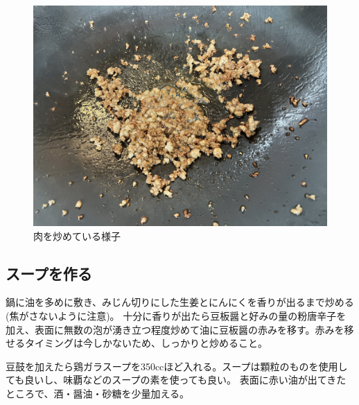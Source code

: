 \documentclass[a4paper,10pt,xelatex,ja=standard,twocolumn]{bxjsarticle}
\begin{document}
\begin{figure}[h]
  \caption{肉を炒めている様子}
  \label{niku}
  \begin{center}
    \includegraphics[width=\linewidth]{IMG_4081.jpg}
  \end{center}
\end{figure}

\subsection{スープを作る}

鍋に油を多めに敷き、みじん切りにした生姜とにんにくを香りが出るまで炒める(焦がさないように注意)。
十分に香りが出たら豆板醤と好みの量の粉唐辛子を加え、表面に無数の泡が湧き立つ程度炒めて油に豆板醤の赤みを移す。赤みを移せるタイミングは今しかないため、しっかりと炒めること。

豆鼓を加えたら鶏ガラスープを350ccほど入れる。スープは顆粒のものを使用しても良いし、味覇などのスープの素を使っても良い。
表面に赤い油が出てきたところで、酒・醤油・砂糖を少量加える。
\end{document}
